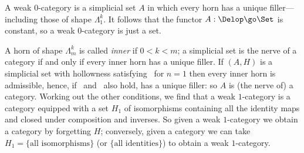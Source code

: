 
A weak $0$-category is a simplicial set $A$ in which every horn has a unique
filler---including those of shape $\Lambda^k_1$.  It follows that the functor
$A: \Delop \go \Set$ is constant, so a weak $0$-category is just a set.



A horn of shape $\Lambda_m^k$ is called \emph{inner} if $0<k<m$; a simplicial
set is the nerve of a category if and only if every inner horn has a unique
filler.  If $(A,H)$ is a simplicial set with hollowness
satisfying~ for $n=1$ then every inner horn is
admissible, hence, if~ and~ also hold,
has a unique filler: so $A$ is (the nerve of) a category.  Working out the
other conditions, we find that a weak $1$-category is a category equipped
with a set $H_1$ of isomorphisms containing all the identity maps and closed
under composition and inverses.  So given a weak $1$-category we obtain a
category by forgetting $H$; conversely, given a category we can take $H_1 =
\{ \textrm{all isomorphisms} \}$ (or $\{ \textrm{all identities} \}$) to
obtain a weak $1$-category.




